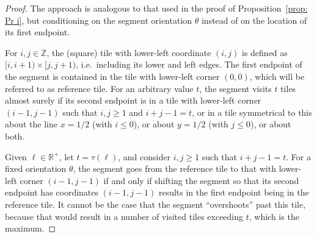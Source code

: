 \documentclass[12pt, a4paper]{article}
\newcommand{\funt}{\tau} %
\newcommand{\len}{\ell} %
\newcommand{\tiles}{t} %
\begin{document}
\begin{proof}
The approach is analogous to that used in the proof of Proposition~\ref{prop: Pr i}, but conditioning on the segment orientation $\theta$ instead of on the location of its first endpoint.

For $i,j \in \mathbb Z$, the (square) tile with lower-left coordinate $(i,j)$ is defined as $[i,i+1) \times [j,j+1)$, i.e.~including its lower and left edges. The first endpoint of the segment is contained in the tile with lower-left corner $(0,0)$, which will be referred to as reference tile. For an arbitrary value $\tiles$, the segment visits $\tiles$ tiles almost surely if its second endpoint is in a tile with lower-left corner $(i-1,j-1)$ such that $i,j\geq 1$ and $i+j-1=\tiles$, or in a tile symmetrical to this about the line $x=1/2$ (with $i \leq 0$), or about $y=1/2$ (with $j \leq 0$), or about both.

Given $\len \in \mathbb R^+$, let $\tiles = \funt(\len)$, and consider $i,j\geq 1$ such that $i+j-1=\tiles$. For a fixed orientation $\theta$, the segment goes from the reference tile to that with lower-left corner $(i-1,j-1)$ if and only if shifting the segment so that its second endpoint has coordinates $(i-1,j-1)$ results in the first endpoint being in the reference tile. It cannot be the case that the segment ``overshoots'' past this tile, because that would result in a number of visited tiles exceeding $\tiles$, which is the maximum.


\end{proof}
\end{document}
